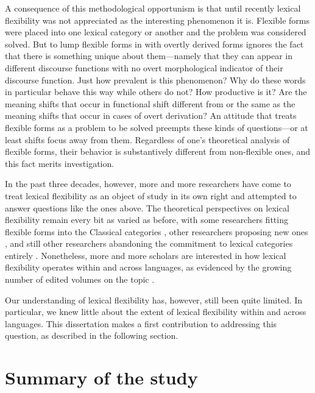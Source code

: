 A consequence of this methodological opportunism is that until recently lexical flexibility was not appreciated as the interesting phenomenon it is. Flexible forms were placed into one lexical category or another and the problem was considered solved. But to lump flexible forms in with overtly derived forms ignores the fact that there is something unique about them—namely that they can appear in different discourse functions with no overt morphological indicator of their discourse function. Just how prevalent is this phenomenon? Why do these words in particular behave this way while others do not? How productive is it? Are the meaning shifts that occur in functional shift different from or the same as the meaning shifts that occur in cases of overt derivation? An attitude that treats flexible forms as a problem to be solved preempts these kinds of questions—or at least shifts focus away from them. Regardless of one's theoretical analysis of flexible forms, their behavior is substantively different from non-flexible ones, and this fact merits investigation.

In the past three decades, however, more and more researchers have come to treat lexical flexibility as an object of study in its own right and attempted to answer questions like the ones above. The theoretical perspectives on lexical flexibility remain every bit as varied as before, with some researchers fitting flexible forms into the Classical categories \parencites{Baker2003}{Dixon2004}{Floyd2011}{Chung2012}{Palmer2017}, other researchers proposing new ones \parencites{HengeveldRijkhoff2005}{Luuk2010}, and still other researchers abandoning the commitment to lexical categories entirely \parencites{Gil1994}{Broschart1997}{Gil2005}. Nonetheless, more and more scholars are interested in how lexical flexibility operates within and across languages, as evidenced by the growing number of edited volumes on the topic \parencites{VogelComrie2000}{LoisVapnarsky2003}{EvansOsada2005}{AnsaldoDonPfau2010}{RijkhoffLier2013}{SimoneMasini2014}{BlaszczakKlimekJankowskaMigdalski2015}{Lier2017}{VapnarskyVeneziano2017a}{VapnarskyVeneziano2017b}{CuyckensHeyvaertHartmann2019}.

Our understanding of lexical flexibility has, however, still been quite limited. In particular, we knew little about the extent of lexical flexibility within and across languages. This dissertation makes a first contribution to addressing this question, as described in the following section.

\section{Summary of the study}
\label{sec:5.2}

